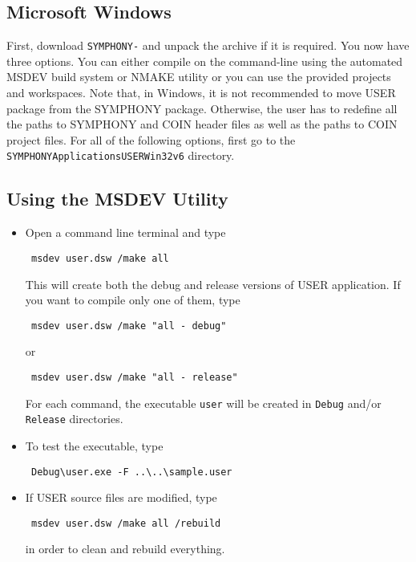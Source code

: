 \subsection{Microsoft Windows}

First, download \texttt{SYMPHONY-\VER} and unpack the archive if it is 
required. You now have three options. You can either compile on the 
command-line using the automated MSDEV build system or NMAKE utility or you can 
use the provided projects and workspaces. Note that, in Windows, it is not 
recommended to move USER package from the SYMPHONY package. Otherwise, 
the user has to redefine all the paths to SYMPHONY and COIN header files 
as well as the paths to COIN project files. For all of the following options, 
first go to the \texttt{SYMPHONY\bs Applications\bs USER\bs Win32\bs v6} 
directory.

\subsection{Using the MSDEV Utility}
\begin{itemize}
\item Open a command line terminal and type
{\color{Brown}
\begin{verbatim}
 msdev user.dsw /make all
\end{verbatim}
}
This will create both the debug and release versions of USER application. 
If you want to compile only one of them, type
{\color{Brown}
\begin{verbatim}
 msdev user.dsw /make "all - debug"
\end{verbatim}
}
or 
{\color{Brown}
\begin{verbatim}
 msdev user.dsw /make "all - release"
\end{verbatim}
}
For each command, the executable \texttt{user} will be created in 
\texttt{Debug} and/or \texttt{Release}
directories. 

\item To test the executable, type 
{\color{Brown}
\begin{verbatim}
 Debug\user.exe -F ..\..\sample.user
\end{verbatim}
}
\item If USER source files are modified, type 
{\color{Brown}
\begin{verbatim}
 msdev user.dsw /make all /rebuild
\end{verbatim}
}
in order to clean and rebuild everything.
\end{itemize} 

